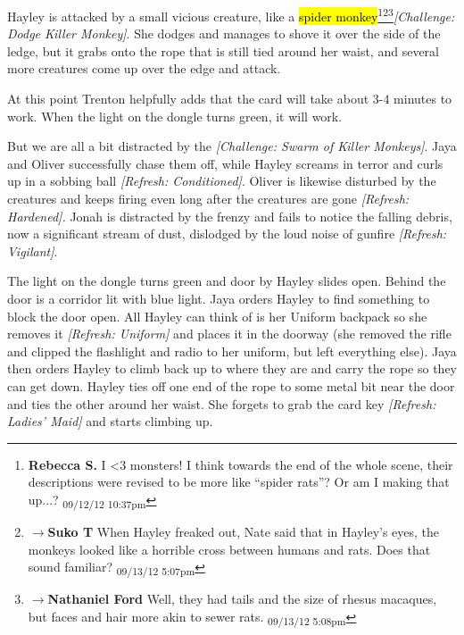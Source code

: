 Hayley is attacked by a small vicious creature, like a \hl{spider monkey}\footnote{\textbf{Rebecca S. }I \textless 3 monsters!  I think towards the end of the whole scene, their descriptions were revised to be more like ``spider rats''?  Or am I making that up...? \textsubscript{09/12/12 10:37pm}}\footnote{$\rightarrow$\textbf{Suko T }When Hayley freaked out, Nate said that in Hayley's eyes, the monkeys looked like a horrible cross between humans and rats.  Does that sound familiar? \textsubscript{09/13/12 5:07pm}}\footnote{$\rightarrow$\textbf{Nathaniel Ford }Well, they had tails and the size of rhesus macaques, but faces and hair more akin to sewer rats. \textsubscript{09/13/12 5:08pm}}\textit{{[}Challenge: Dodge Killer Monkey{]}}.  She dodges and manages to shove it over the side of the ledge, but it grabs onto the rope that is still tied around her waist, and several more creatures come up over the edge and attack.



At this point Trenton helpfully adds that the card will take about 3-4 minutes to work.  When the light on the dongle turns green, it will work.



But we are all a bit distracted by the \textit{{[}Challenge: Swarm of Killer Monkeys{]}}.  Jaya and Oliver successfully chase them off, while Hayley screams in terror and curls up in a sobbing ball \textit{{[}Refresh: Conditioned{]}}.  Oliver is likewise disturbed by the creatures and keeps firing even long after the creatures are gone \textit{{[}Refresh: Hardened{]}.}  Jonah is distracted by the frenzy and fails to notice the falling debris, now a significant stream of dust, dislodged by the loud noise of gunfire \textit{{[}Refresh: Vigilant{]}}.



The light on the dongle turns green and door by Hayley slides open.  Behind the door is a corridor lit with blue light.  Jaya orders Hayley to find something to block the door open.  All Hayley can think of is her Uniform backpack so she removes it \textit{{[}Refresh: Uniform{]}} and places it in the doorway (she removed the rifle and clipped the flashlight and radio to her uniform, but left everything else).  Jaya then orders Hayley to climb back up to where they are and carry the rope so they can get down.  Hayley ties off one end of the rope to some metal bit near the door and ties the other around her waist. She forgets to grab the card key \textit{{[}Refresh: Ladies' Maid{]} }and starts climbing up.



